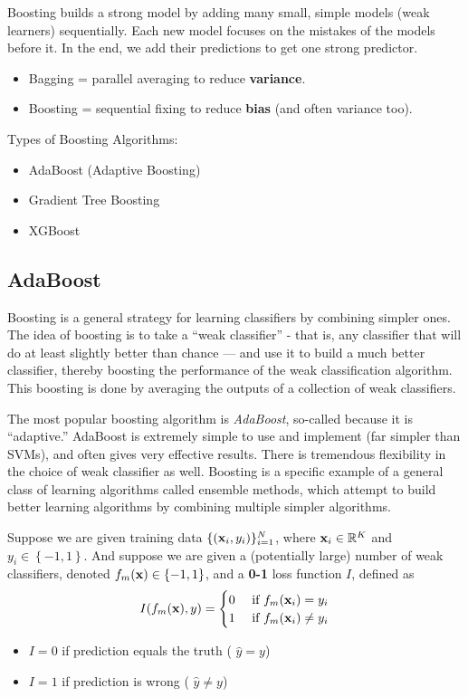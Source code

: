 Boosting builds a strong model by adding many small, simple models (weak learners) sequentially. Each new model focuses on the mistakes of the models before it. In the end, we add their predictions to get one strong predictor.

\begin{itemize}
	\item Bagging = parallel averaging to reduce \textbf{variance}.
	\item Boosting = sequential fixing to reduce \textbf{bias} (and often variance too).
\end{itemize}

Types of Boosting Algorithms:
\begin{itemize}
	\item AdaBoost (Adaptive Boosting)
	\item Gradient Tree Boosting
	\item XGBoost
\end{itemize}

\subsection{AdaBoost}

Boosting is a general strategy for learning classifiers by combining simpler ones. The idea of boosting is to take a ``weak classifier'' - that is, any classifier that will do at least slightly better than chance — and use it to build a much better classifier, thereby boosting the performance of the weak classification algorithm. This boosting is done by averaging the outputs of a collection of weak classifiers. 

The most popular boosting algorithm is \textit{AdaBoost}, so-called because it is ``adaptive.'' AdaBoost is extremely simple to use and implement (far simpler than SVMs), and often gives very effective results. There is tremendous flexibility in the choice of weak classifier as well. Boosting is a specific example of a general class of learning algorithms called ensemble methods, which attempt to build better learning algorithms by combining multiple simpler algorithms.

Suppose we are given training data $\{({\mathbf{x}}_i, y_i)\}^N_{i=1}$, where ${\mathbf{x}}_i \in \mathbb{R}^K$ and $y_i \in \left\{-1, 1\right\}$. And suppose we are given a (potentially large) number of weak classifiers, denoted $f_m({\mathbf{x}}) \in \left\{-1, 1\right\}$, and a \textbf{0-1} loss function $I$, defined as
\begin{align*}
	I(f_m({\mathbf{x}}), y) = \begin{cases}
		0&\text{ if } f_m({\mathbf{x}}_i)=y_i\\
		1&\text{ if } f_m({\mathbf{x}}_i)\neq y_i
	\end{cases}
\end{align*}
\begin{itemize}
	\item $I=0$ if prediction equals the truth ( $\hat{y}=y$)
	\item $I=1$ if prediction is wrong ( $\hat{y}\neq y$)
\end{itemize}

